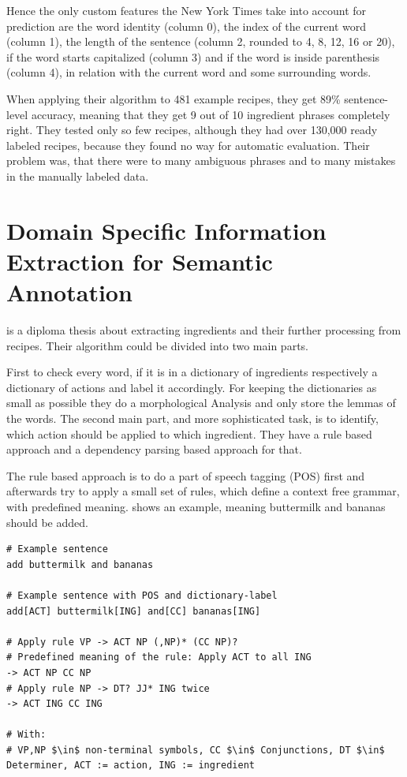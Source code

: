 \documentclass[12pt, twoside]{report}
\begin{document}
Hence the only custom features the New York Times take into account for prediction are the word identity (column 0), the index of the current word (column 1), the length of the sentence (column 2, rounded to 4, 8, 12, 16 or 20), if the word starts capitalized (column 3) and if the word is inside parenthesis (column 4), in relation with the current word and some surrounding words.

When applying their algorithm to 481 example recipes, they get 89\% sentence-level accuracy, meaning that they get 9 out of 10 ingredient phrases completely right. They tested only so few recipes, although they had over 130,000 ready labeled recipes, because they found no way for automatic evaluation. Their problem was, that there were to many ambiguous phrases and to many mistakes in the manually labeled data.
 
 
\section{Domain Specific Information Extraction for Semantic Annotation}
\parencite{GrammaBased} is a diploma thesis about extracting ingredients and their further processing from recipes. Their algorithm could be divided into two main parts.

First to check every word, if it is in a dictionary of ingredients respectively a dictionary of actions and label it accordingly. For keeping the dictionaries as small as possible they do a morphological Analysis and only store the lemmas of the words. The second main part, and more sophisticated task, is to identify, which action should be applied to which ingredient. They have a rule based approach and a dependency parsing based approach for that.

The rule based approach is to do a part of speech tagging (POS) first and afterwards try to apply a small set of rules, which define a context free grammar, with predefined meaning.  shows an example, meaning buttermilk and bananas should be added.

\begin{lstlisting}[frame=single, basicstyle=\footnotesize\ttfamily,caption={Rule based example}, label=lst:ruleBased, mathescape]
# Example sentence
add buttermilk and bananas

# Example sentence with POS and dictionary-label
add[ACT] buttermilk[ING] and[CC] bananas[ING]

# Apply rule VP -> ACT NP (,NP)* (CC NP)?
# Predefined meaning of the rule: Apply ACT to all ING  
-> ACT NP CC NP
# Apply rule NP -> DT? JJ* ING twice  
-> ACT ING CC ING

# With: 
# VP,NP $\in$ non-terminal symbols, CC $\in$ Conjunctions, DT $\in$ Determiner, ACT := action, ING := ingredient
\end{lstlisting}
\end{document}

